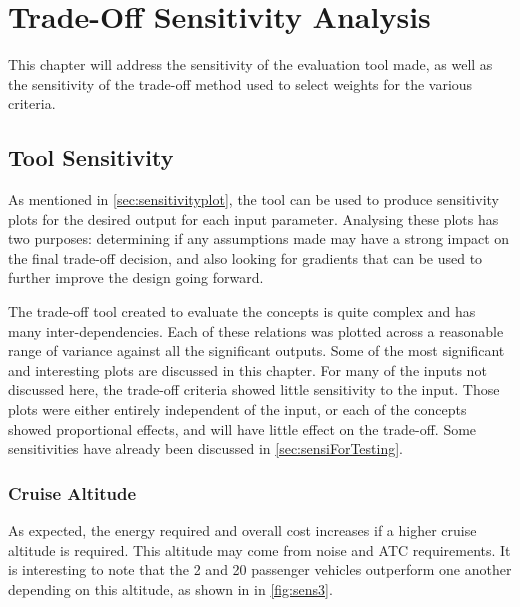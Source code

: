 \newpage
\chapter{Trade-Off Sensitivity Analysis} \label{ch:sensitivity}

This chapter will address the sensitivity of the evaluation tool made, as well as the sensitivity of the trade-off method used to select weights for the various criteria. 


\section{Tool Sensitivity}

As mentioned in \autoref{sec:sensitivityplot}, the tool can be used to produce sensitivity plots for the desired output for each input parameter. Analysing these plots has two purposes: determining if any assumptions made may have a strong impact on the final trade-off decision, and also looking for gradients that can be used to further improve the design going forward.

The trade-off tool created to evaluate the concepts is quite complex and has many inter-dependencies. Each of these relations was plotted across a reasonable range of variance against all the significant outputs. Some of the most significant and interesting plots are discussed in this chapter. For many of the inputs not discussed here, the trade-off criteria showed little sensitivity to the input. Those plots were either entirely independent of the input, or each of the concepts showed proportional effects, and will have little effect on the trade-off. Some sensitivities have already been discussed in \autoref{sec:sensiForTesting}.

\subsection{Cruise Altitude}
As expected, the energy required and overall cost increases if a higher cruise altitude is required. This altitude may come from noise and ATC requirements. It is interesting to note that the 2 and 20 passenger vehicles outperform one another depending on this altitude, as shown in in \autoref{fig:sens3}. 





